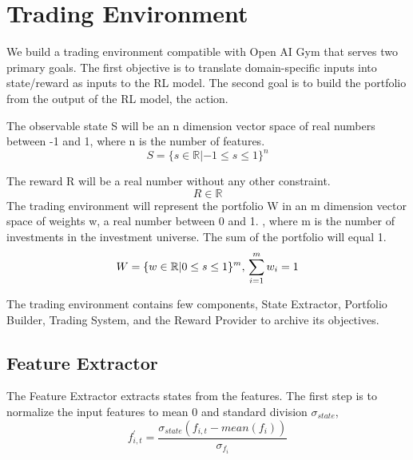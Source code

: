 \section{Trading Environment}
We build a trading environment compatible with Open AI Gym \cite{brockman2016openai} that serves two primary goals. The first objective is to translate domain-specific inputs into state/reward as inputs to the RL model. The second goal is to build the portfolio from the output of the RL model, the action.

\par
The observable state S will be an n dimension vector space of real numbers between -1 and 1, where n is the number of features.
\[
    S = \{ {s \in \mathbb{R} | -1 \leq s \leq 1 } \} ^n
\]

\par
The reward R will be a real number without any other constraint.
\[
    R \in \mathbb{R}
\]
The trading environment will represent the portfolio W in an m dimension vector space of weights w, a real number between 0 and 1. , where m is the number of investments in the investment universe. The sum of the portfolio will equal 1.
\[
    W = \{ {w \in \mathbb{R} | 0 \leq s \leq 1 } \} ^m,
    \\
    \sum_{i=1}^m {w_i} =1
\]
\par
The trading environment contains few components, State Extractor, Portfolio Builder, Trading System, and the Reward Provider to archive its objectives.

\subsection {Feature Extractor}
The Feature Extractor extracts states from the features. 
The first step is to normalize the input features to mean 0 and standard division \(\sigma_{state}\),
\[
    f^{'}_{i,t} = \frac{\sigma_{state}  (f_{i,t} -  mean(f_i))}{\sigma_{f_i}}
\]

